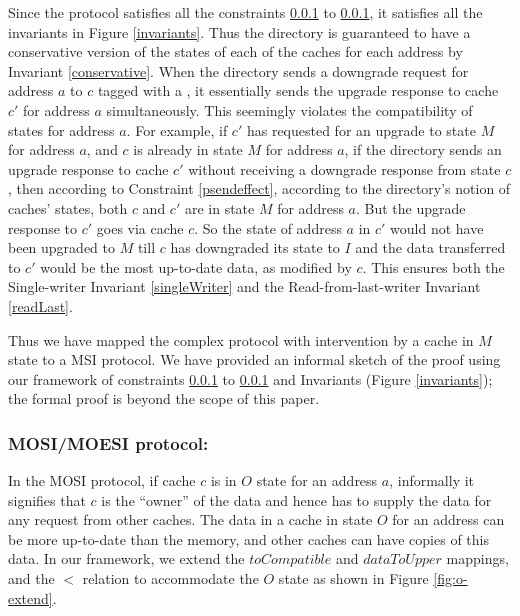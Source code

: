 Since the protocol satisfies all the constraints \ref{} to \ref{}, it satisfies
all the invariants in Figure \ref{invariants}. Thus the directory is guaranteed
to have a conservative version of the states of each of the caches for each
address by Invariant \ref{conservative}. When the directory sends a downgrade
request for address $a$ to $c$ tagged with a , it essentially
sends the upgrade response to cache $c'$ for address $a$ simultaneously. This
seemingly violates the compatibility of states for address $a$. For example, if
$c'$ has requested for an upgrade to state $M$ for address $a$, and $c$ is
already in state $M$ for address $a$, if the directory sends an upgrade response
to cache $c'$ without receiving a downgrade response from state $c$, then
according to Constraint \ref{psendeffect}, according to the directory's notion
of caches' states, both $c$ and $c'$ are in state $M$ for address $a$. But the
upgrade response to $c'$ goes via cache $c$. So the state of address $a$ in $c'$
would not have been upgraded to $M$ till $c$ has downgraded its state to $I$ and
the data transferred to $c'$ would be the most up-to-date data, as modified by
$c$. This ensures both the Single-writer Invariant \ref{singleWriter} and the
Read-from-last-writer Invariant \ref{readLast}.

Thus we have mapped the complex protocol with intervention by a cache in $M$
state to a MSI protocol. We have provided an informal sketch of the
proof using our framework of constraints \ref{} to \ref{} and Invariants (Figure
\ref{invariants}); the formal proof is beyond the scope of this paper.

\subsubsection{MOSI/MOESI protocol:}
In the MOSI protocol, if cache $c$ is in $O$ state for an address $a$, informally
it signifies that $c$ is the ``owner'' of the data and hence has to supply the
data for any request from other caches. The data in a cache in state $O$ for an
address can be more up-to-date than the memory, and other caches can have copies
of this data.  In our framework, we extend the $toCompatible$ and $dataToUpper$
mappings, and the $<$ relation to accommodate the $O$ state as shown in Figure
\ref{fig:o-extend}.

